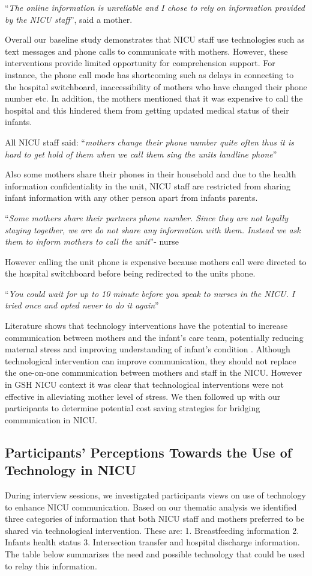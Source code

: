 \enquote{\itshape The online information is unreliable and I chose to rely on information provided by the NICU staff}, said a mother.

Overall our baseline study demonstrates that NICU staff use technologies such as text messages and phone calls to communicate with mothers. However, these interventions provide limited opportunity for comprehension support. For instance, the phone call mode has shortcoming such as delays in connecting to the hospital switchboard, inaccessibility of mothers who have changed their phone number etc. In addition, the mothers mentioned that it was expensive to call the hospital and this hindered them from getting updated medical status of their infants.

All NICU staff said: \enquote{\itshape mothers change their phone number quite often thus it is hard to get hold of them when we call them sing the units landline phone} 

Also some mothers share their phones in their household and due to the health information confidentiality in the unit, NICU staff are restricted from sharing infant information with any other person apart from infants parents.

\enquote{\itshape  Some  mothers share their partners phone number. Since they are not legally staying together, we are do not share any information with them. Instead we ask them to inform mothers to call the unit}- nurse

However calling the unit phone is expensive because mothers call were directed to the hospital switchboard before being redirected to the units phone.

\enquote{\itshape You could wait for up to 10 minute before you speak to nurses in the NICU. I tried once and opted never to do it again}

Literature shows that technology interventions have the potential to increase communication between mothers and the infant’s care team, potentially reducing maternal stress and improving understanding of infant's condition \citep{Garfield2016, Weems2016}. Although technological intervention can improve communication, they should not replace the one-on-one communication between mothers and staff in the NICU. However in GSH NICU context it was clear that technological interventions were not effective in alleviating mother level of stress. We then followed up with our participants to determine potential cost saving strategies for bridging communication in NICU.

\subsection{Participants' Perceptions Towards the Use of Technology in NICU}
During interview sessions, we investigated participants views on use of technology to enhance NICU communication. Based on our thematic analysis we identified three categories of information that both NICU staff and mothers preferred to be shared via technological intervention. These are: 1. Breastfeeding information 2. Infants health status 3. Intersection transfer and hospital discharge information. The table below summarizes the need and possible technology that could be used to relay this information.

